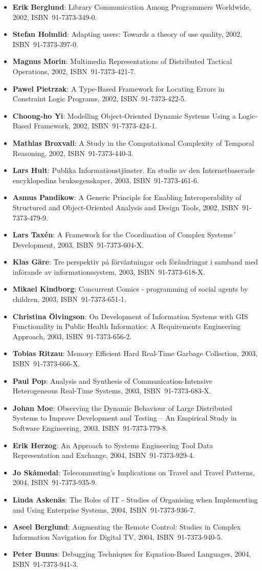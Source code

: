 \documentclass[a4paper,showtrims,twocolumn]{memoir}
\newenvironment{theses}{
  \begin{itemize}
    \setlength{\itemsep}{0.2em}
    \setlength{\parskip}{0em}
    \setlength{\parsep}{0em}
}{
  \end{itemize}
}
\newcommand{\thesis}[5]{\item[No. #1] \textbf{#2}: #3, #4, ISBN~#5.}
\begin{document}
\begin{theses}
    \thesis{758}{Erik Berglund}{Library Communication Among Programmers Worldwide}{2002}{91-7373-349-0}
    \thesis{765}{Stefan Holmlid}{Adapting users: Towards a theory of use quality}{2002}{91-7373-397-0}
    \thesis{771}{Magnus Morin}{Multimedia Representations of Distributed Tactical Operations}{2002}{91-7373-421-7}
    \thesis{772}{Pawel Pietrzak}{A Type-Based Framework for Locating Errors in Constraint Logic Programs}{2002}{91-7373-422-5}
    \thesis{774}{Choong-ho Yi}{Modelling Object-Oriented Dynamic Systems Using a Logic-Based Framework}{2002}{91-7373-424-1}
    \thesis{779}{Mathias Broxvall}{A Study in the Computational Complexity of Temporal Reasoning}{2002}{91-7373-440-3}
    \thesis{785}{Lars Hult}{Publika Informationstjänster. En studie av den Internetbaserade encyklopedins bruksegenskaper}{2003}{91-7373-461-6}
    \thesis{793}{Asmus Pandikow}{A Generic Principle for Enabling Interoperability of Structured and Object-Oriented Analysis and Design Tools}{2002}{91-7373-479-9}
    \thesis{800}{Lars Taxén}{A Framework for the Coordination of Complex Systems´ Development}{2003}{91-7373-604-X}
    \thesis{808}{Klas Gäre}{Tre perspektiv på förväntningar och förändringar i samband med införande av informationssystem}{2003}{91-7373-618-X}
    \thesis{821}{Mikael Kindborg}{Concurrent Comics - programming of social agents by children}{2003}{91-7373-651-1}
    \thesis{823}{Christina Ölvingson}{On Development of Information Systems with GIS Functionality in Public Health Informatics: A Requirements Engineering Approach}{2003}{91-7373-656-2}
    \thesis{828}{Tobias Ritzau}{Memory Efficient Hard Real-Time Garbage Collection}{2003}{91-7373-666-X}
    \thesis{833}{Paul Pop}{Analysis and Synthesis of Communication-Intensive Heterogeneous Real-Time Systems}{2003}{91-7373-683-X}
    \thesis{852}{Johan Moe}{Observing the Dynamic Behaviour of Large Distributed Systems to Improve Development and Testing – An Empirical Study in Software Engineering}{2003}{91-7373-779-8}
    \thesis{867}{Erik Herzog}{An Approach to Systems Engineering Tool Data Representation and Exchange}{2004}{91-7373-929-4}
    \thesis{869}{Jo Skåmedal}{Telecommuting’s Implications on Travel and Travel Patterns}{2004}{91-7373-935-9}
    \thesis{870}{Linda Askenäs}{The Roles of IT - Studies of Organising when Implementing and Using Enterprise Systems}{2004}{91-7373-936-7}
    \thesis{872}{Aseel Berglund}{Augmenting the Remote Control: Studies in Complex Information Navigation for Digital TV}{2004}{91-7373-940-5}
    \thesis{873}{Peter Bunus}{Debugging Techniques for Equation-Based Languages}{2004}{91-7373-941-3}

\end{theses}
\end{document}
